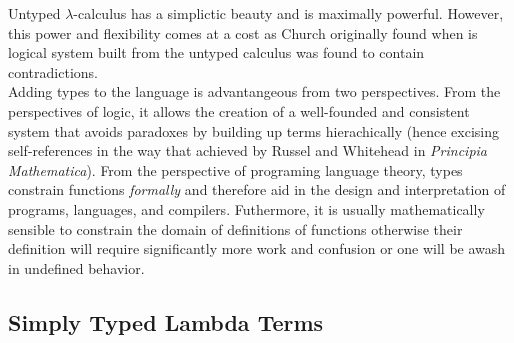 \documentclass[12pt]{article}
\begin{document}
Untyped $\lambda$-calculus has a simplictic beauty and is maximally powerful. However, this power and flexibility comes at a cost as Church originally found when is logical system built from the untyped calculus was found to contain contradictions. 
\bigskip\\
Adding types to the language is advantangeous from two perspectives. From the perspectives of logic, it allows the creation of a well-founded and consistent system that avoids paradoxes by building up terms hierachically (hence excising self-references in the way that achieved by Russel and Whitehead in \textit{Principia Mathematica}). From the perspective of programing language theory, types constrain functions \textit{formally} and therefore aid in the design and interpretation of programs, languages, and compilers. Futhermore, it is usually mathematically sensible to constrain the domain of definitions of functions otherwise their definition will require significantly more work and confusion or one will be awash in undefined behavior. 


\subsection{Simply Typed Lambda Terms}
\end{document}
